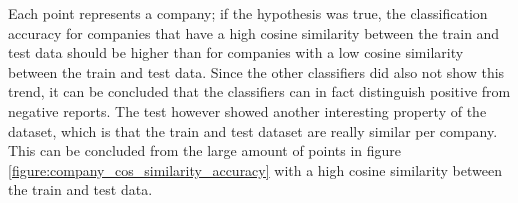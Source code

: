 Each point represents a company; if the hypothesis was true, the classification accuracy for companies that have a high cosine similarity between the train and test data should be higher than for companies with a low cosine similarity between the train and test data.
Since the other classifiers did also not show this trend, it can be concluded that the classifiers can in fact distinguish positive from negative reports.
The test however showed another interesting property of the dataset, which is that the train and test dataset are really similar per company.
This can be concluded from the large amount of points in figure \ref{figure:company_cos_similarity_accuracy} with a high cosine similarity between the train and test data.





